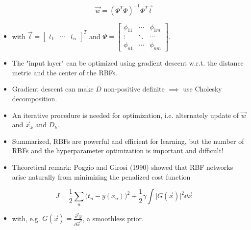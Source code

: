		\begin{equation}
			\vec{w} = (\Phi^T \Phi)^{-1} \Phi^T \vec{t}
		\end{equation}
		\begin{itemize}
			\item[] with \( \vec{t} = \begin{bmatrix} t_1 & \cdots & t_n \end{bmatrix}^T \) and \( \Phi = \begin{bmatrix}
					\phi_{11} & \cdots & \phi_{1m} \\
					\vdots    & \ddots & \cdots    \\
					\phi_{n1} & \cdots & \phi_{nm}
				\end{bmatrix} \).
			\item The "input layer" can be optimized using gradient descent w.r.t. the distance metric and the center of the RBFs.
			\item Gradient descent can make \(D\) non-positive definite \(\implies\) use Cholesky decomposition.
			\item An iterative procedure is needed for optimization, i.e. alternately update of \(\vec{w}\) and \(\vec{x}_k\) and \(D_k\).
			\item Summarized, RBFs are powerful and efficient for learning, but the number of RBFs and the hyperparameter optimization is important and difficult!
			\item Theoretical remark: Poggio and Girosi (1990) showed that RBF networks arise naturally from minimizing the penalized cost function
		\end{itemize}
		\begin{equation}
			J = \frac{1}{2} \sum_n \big(t_n - y(x_n)\big)^2 + \frac{1}{2} \gamma \int \big\lvert G(\vec{x}) \big\rvert^2 \dd{\vec{x}}
		\end{equation}
		\begin{itemize}
			\item[] with, e.g. \( G(\vec{x}) = \frac{\partial^2 y}{\partial \vec{x}^2} \), a smoothless prior.
		\end{itemize}

